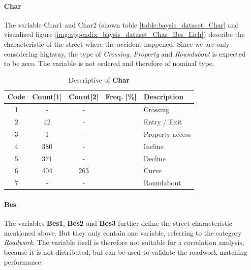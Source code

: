 \paragraph{Char}
\label{baysis_dataset_Char}
The variable Char1 and Char2 (shown table \autoref{table:baysis_dataset_Char} and visualized figure \autoref{img:appendix_baysis_dataset_Char_Bes_Lich}) describe the characteristic of the street where the accident happened. Since we are only considering highway, the type of \textit{Crossing}, \textit{Property} and \textit{Roundabout} is expected to be zero. The variable is not ordered and therefore of nominal type.  
\begin{table}[ht]
	\centering
	\small
	\begin{tabular}{c|c|c|c|l}
		\toprule
		Code & Count[1] & Count[2] & Freq. [\%] & Description \\ 
		\midrule
		1 & - 	& -		&	& Crossing \\
	    2 & 42	& -		&	& Entry / Exit \\
	    3 & 1	& -		&	& Property access \\
	    4 & 380	& -		&	& Incline \\
	    5 & 371	& -		&	& Decline \\
	    6 & 404	& 263	&	& Curve \\
		7 & -	& -		&	& Roundabout \\
		\bottomrule
	\end{tabular}
	\caption{Descriptive of \textbf{Char}}
	\label{table:baysis_dataset_Char}
	\vspace{-8mm}
\end{table}

\paragraph{Bes}
\label{baysis_dataset_Bes}
The variables \textbf{Bes1}, \textbf{Bes2} and \textbf{Bes3} further define the street characteristic mentioned above. But they only contain one variable, referring to the category \textit{Roadwork}. The variable itself is therefore not suitable for a correlation analysis, because it is not distributed, but can be used to validate the roadwork matching performance.

